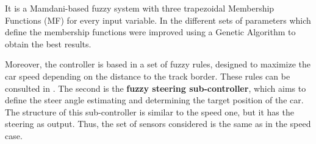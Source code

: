 \documentclass[10pt,journal,compsoc]{IEEEtran}
\begin{document}
It is a Mamdani-based fuzzy system \cite{iancu2012} with three
trapezoidal Membership Functions (MF) for every input variable. 
In \cite{salem_evo18} the different sets of parameters which define the membership functions were improved using a Genetic Algorithm to obtain the best results.

Moreover, the controller is based in a set of fuzzy rules, designed to
maximize the car speed depending on the distance to the track
border. These rules can be consulted in \cite{salem_evo17}.
%
%
%
%
%
%
%
The second is the \textbf{fuzzy steering sub-controller}, which aims to define the steer angle estimating and determining the target position of the car. 
%
The structure of this sub-controller is similar to the speed one, but it has the steering as output. Thus, the set of sensors considered is the same as in the speed case.
\end{document}
